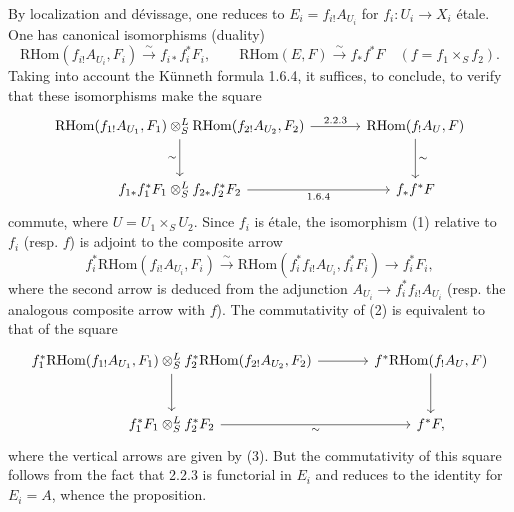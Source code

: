\documentclass[11pt]{article}
\providecommand{\RHom}{\mathrm{RHom}}
\begin{document}
By localization and dévissage, one reduces to $E_i=f_{i!}A_{U_i}$ for $f_i:U_i\to X_i$ étale. One has canonical isomorphisms (duality)
\begin{equation}\tag{1}
\RHom(f_{i!}A_{U_i},F_i)\xrightarrow{\sim}f_{i*}f_i^{*}F_i,
\qquad
\RHom(E,F)\xrightarrow{\sim}f_{*}f^{*}F\quad(f=f_1\times_S f_2).
\end{equation}
Taking into account the Künneth formula 1.6.4, it suffices, to conclude, to verify that these isomorphisms make the square
\[
\begin{tikzcd}[column sep=large,row sep=large]
\RHom(f_{1!}A_{U_1},F_1)\otimes^{L}_{S}\RHom(f_{2!}A_{U_2},F_2) \arrow[r,"2.2.3"] \arrow[d,"\sim"'] & \RHom(f_{!}A_U,F) \arrow[d,"\sim"]\\
f_{1*}f_1^{*}F_1\otimes^{L}_{S}f_{2*}f_2^{*}F_2 \arrow[r,"1.6.4"'] & f_{*}f^{*}F
\end{tikzcd}
\]
commute, where $U=U_1\times_SU_2$. Since $f_i$ is étale, the isomorphism (1) relative to $f_i$ (resp. $f$) is adjoint to the composite arrow
\begin{equation}\tag{3}
f_i^{*}\RHom(f_{i!}A_{U_i},F_i)\xrightarrow{\sim}\RHom(f_i^{*}f_{i!}A_{U_i},f_i^{*}F_i)\longrightarrow f_i^{*}F_i,
\end{equation}
where the second arrow is deduced from the adjunction $A_{U_i}\to f_i^{*}f_{i!}A_{U_i}$ (resp. the analogous composite arrow with $f$). The commutativity of (2) is equivalent to that of the square
\[
\begin{tikzcd}[column sep=large,row sep=large]
f_1^{*}\RHom(f_{1!}A_{U_1},F_1)\otimes^{L}_{S}f_2^{*}\RHom(f_{2!}A_{U_2},F_2) \arrow[r] \arrow[d] & f^{*}\RHom(f_{!}A_U,F) \arrow[d]\\
f_1^{*}F_1\otimes^{L}_{S}f_2^{*}F_2 \arrow[r,"\sim"'] & f^{*}F,
\end{tikzcd}
\]
where the vertical arrows are given by (3). But the commutativity of this square follows from the fact that 2.2.3 is functorial in $E_i$ and reduces to the identity for $E_i=A$, whence the proposition.
\end{document}
